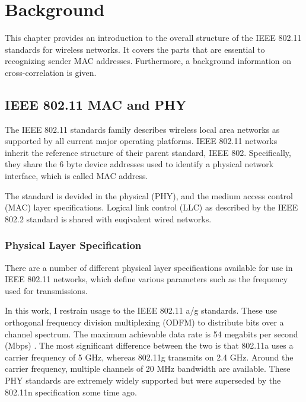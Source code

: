 
\chapter{Background}\label{ch:relatedwork}
\glsresetall %

This chapter provides an introduction to the overall structure of the IEEE 802.11 standards for wireless networks. It covers the parts that are essential to recognizing sender MAC addresses. Furthermore, a background information on cross-correlation is given.



\section{IEEE 802.11 MAC and PHY} \label{sec:mac-and-phy}

The IEEE 802.11 standards family describes wireless local area networks as supported by all current major operating platforms. IEEE 802.11 networks inherit the reference structure of their parent standard, IEEE 802. Specifically, they share the 6 byte device addresses used to identify a physical network interface, which is called MAC address.

The standard is devided in the physical (PHY), and the medium access control (MAC) layer specifications. Logical link control (LLC) as described by the IEEE 802.2 standard is shared with euqivalent wired networks.


\subsection{Physical Layer Specification}

There are a number of different physical layer specifications available for use in IEEE 802.11 networks, which define various parameters such as the frequency used for transmissions.

In this work, I restrain usage to the IEEE 802.11 a/g standards. These use orthogonal frequency division multiplexing (ODFM) to distribute bits over a channel spectrum. The maximum achievable data rate is 54 megabits per second (Mbps) \cite{ieee2012}. The most significant difference between the two is that 802.11a uses a carrier frequency of 5 GHz, whereas 802.11g transmits on 2.4 GHz. Around the carrier frequency, multiple channels of 20 MHz bandwidth are available. These PHY standards are extremely widely supported but were superseded by the 802.11n specification some time ago.

